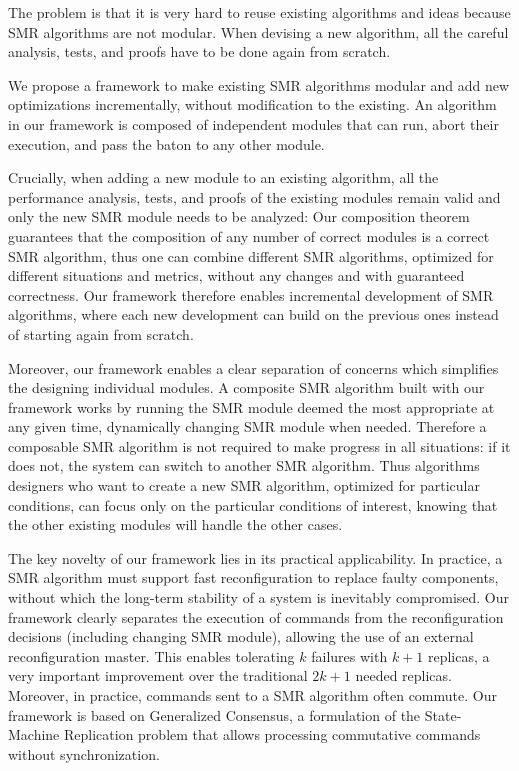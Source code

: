The problem is that it is very hard to reuse existing algorithms and ideas because SMR algorithms are not modular. When devising a new algorithm, all the careful analysis, tests, and proofs have to be done again from scratch.

We propose a framework to make existing SMR algorithms modular and add new optimizations incrementally, without modification to the existing. 
An algorithm in our framework is composed of independent modules that can run, abort their execution, and pass the baton to any other module.

Crucially, when adding a new module to an existing algorithm, all the performance analysis, tests, and proofs of the existing modules remain valid and only the new SMR module needs to be analyzed: Our composition theorem guarantees that the composition of any number of correct modules is a correct SMR algorithm, thus one can combine different SMR algorithms, optimized for different situations and metrics, without any changes and with guaranteed correctness.
Our framework therefore enables incremental development of SMR algorithms, where each new development can build on the previous ones instead of starting again from scratch.

Moreover, our framework enables a clear separation of concerns  which simplifies the designing individual modules.
A composite SMR algorithm built with our framework works by running the SMR module deemed the most appropriate at any given time, dynamically changing SMR module when needed. Therefore a composable SMR algorithm is not required to make progress in all situations: if it does not, the system can switch to another SMR algorithm.
Thus algorithms designers who want to create a new SMR algorithm, optimized for particular conditions, can focus only on the particular conditions of interest, knowing that the other existing modules will handle the other cases. 

The key novelty of our framework lies in its practical applicability. In practice, a SMR algorithm must support fast reconfiguration to replace faulty components, without which the long-term stability of a system is inevitably compromised. Our framework clearly separates the execution of commands from the reconfiguration decisions (including changing SMR module), allowing the use of an external reconfiguration master. This enables tolerating $k$ failures with $k+1$ replicas, a very
important improvement over the traditional $2k+1$ needed replicas.
Moreover, in practice, commands sent to a SMR algorithm often commute. Our framework is based on Generalized Consensus, a formulation of the State-Machine Replication problem that allows processing commutative commands without synchronization.

